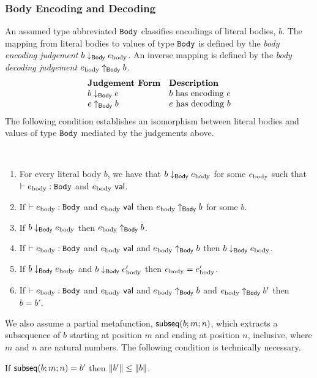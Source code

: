 \subsubsection{Body Encoding and Decoding}
An assumed type abbreviated $\mathtt{Body}$ classifies encodings of literal bodies, $b$. The mapping from literal bodies to values of type $\mathtt{Body}$ is defined by the \emph{body encoding judgement} $b \downarrow_\mathsf{Body} e_\text{body}$. An inverse mapping is defined   by the \emph{body decoding judgement} $e_\text{body} \uparrow_\mathsf{Body} b$.
\[\begin{array}{ll}
\textbf{Judgement Form} & \textbf{Description}\\
b \downarrow_\mathsf{Body} e & \text{$b$ has encoding $e$}\\
e \uparrow_\mathsf{Body} b & \text{$e$ has decoding $b$}
\end{array}\]
The following condition establishes an isomorphism between literal bodies and values of type $\mathtt{Body}$ mediated by the judgements above.
\begin{condition}\label{condition:body-isomorphism-P} ~
\begin{enumerate}
\item For every literal body $b$, we have that $b \downarrow_\mathsf{Body} e_\text{body}$ for some $e_\text{body}$ such that $\vdash e_\text{body} : \mathtt{Body}$ and $e_\text{body}~\mathsf{val}$.
\item If $\vdash e_\text{body} : \mathtt{Body}$ and $e_\text{body}~\mathsf{val}$ then $e_\text{body} \uparrow_\mathsf{Body} b$ for some $b$.
\item If $b \downarrow_\mathsf{Body} e_\text{body}$ then $e_\text{body} \uparrow_\mathsf{Body} b$.
\item If $\vdash e_\text{body} : \mathtt{Body}$ and $e_\text{body}~\mathsf{val}$ and $e_\text{body} \uparrow_\mathsf{Body} b$ then $b \downarrow_\mathsf{Body} e_\text{body}$. 
\item If $b \downarrow_\mathsf{Body} e_\text{body}$ and $b \downarrow_\mathsf{Body} e_\text{body}'$ then $e_\text{body} = e_\text{body}'$.
\item If $\vdash e_\text{body} : \mathtt{Body}$ and $e_\text{body}~\mathsf{val}$ and $e_\text{body} \uparrow_\mathsf{Body} b$ and $e_\text{body} \uparrow_\mathsf{Body} b'$ then $b=b'$.
\end{enumerate}
\end{condition}
We also assume a partial metafunction, $\mathsf{subseq}(b; m; n)$, which extracts a subsequence of $b$ starting at position $m$ and ending at position $n$, inclusive, where $m$ and $n$ are natural numbers. The following condition is technically necessary.
\begin{condition}\label{condition:body-subsequences-P} If $\mathsf{subseq}(b; m; n)=b'$ then $\Vert b' \Vert \leq \Vert b \Vert$. \end{condition}

